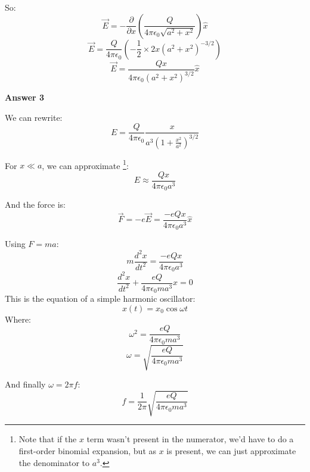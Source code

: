 So:
\[
    \vec{E} = - \frac{\partial}{\partial x} \left(\frac{Q}{4 \pi \epsilon_0 \sqrt{a^2 + x^2}}\right) \hat{x}
\]
\[
    \vec{E} = \frac{Q}{4 \pi \epsilon_0} \left(- \frac{1}{2} \times 2x (a^2 + x^2)^{-3/2}\right)
\]
\[
    \vec{E} = \frac{Qx}{4 \pi \epsilon_0 (a^2 + x^2)^{3/2}} \hat{x}
\]

\textbf{Answer 3}

We can rewrite:
\[
    E = \frac{Q}{4 \pi \epsilon_0} \frac{x}{a^3 \left(1 + \frac{x^2}{a^2} \right)^{3/2}}
\]

For $x \ll a$, we can approximate \footnote{Note that if the $x$ term wasn't present in the numerator, we'd have to do a first-order binomial expansion, but as $x$ is present, we can just approximate the denominator to $a^3$.}:
\[
    E \approx \frac{Qx}{4 \pi \epsilon_0 a^3}
\]

And the force is:
\[
    \vec{F} = -e \vec{E} = \frac{-e Qx}{4 \pi \epsilon_0 a^3} \hat{x}
\]

Using $F = ma$:
\[
    m \frac{d^2 x}{dt^2} = \frac{-e Qx}{4 \pi \epsilon_0 a^3}
\]
\[    \frac{d^2 x}{dt^2} + \frac{e Q}{4 \pi \epsilon_0 m a^3} x = 0
\]
This is the equation of a simple harmonic oscillator:
\[
    x(t) = x_0 \cos \omega t
\]
Where:
\[    \omega^2 = \frac{e Q}{4 \pi \epsilon_0 m a^3}
\]
\[
    \omega = \sqrt{\frac{e Q}{4 \pi \epsilon_0 m a^3}}
\]

And finally $\omega = 2 \pi f$:
\[
    f = \frac{1}{2 \pi} \sqrt{\frac{e Q}{4 \pi \epsilon_0 m a^3}}
\]
